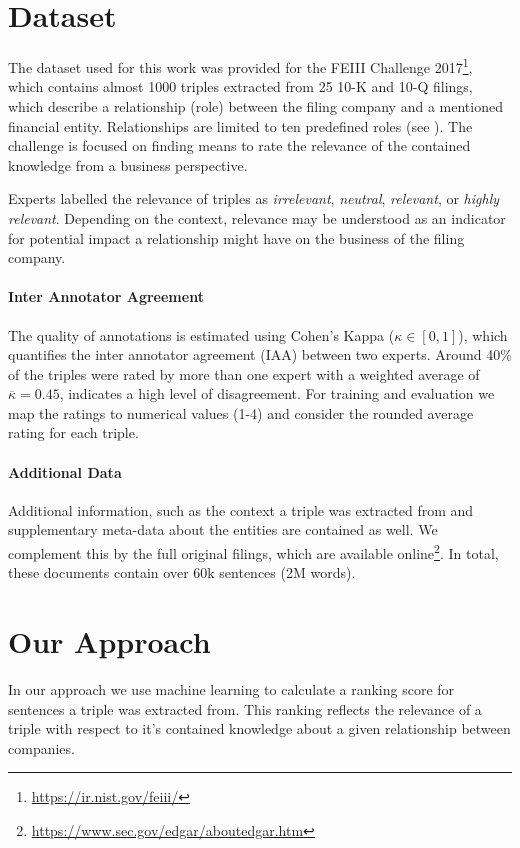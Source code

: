 \section{Dataset}
The dataset used for this work was provided for the FEIII Challenge 2017\footnote{\url{https://ir.nist.gov/feiii/}}, which contains almost 1000 triples extracted from 25 10-K and 10-Q filings, which describe a relationship (role) between the filing company and a mentioned financial entity.
Relationships are limited to ten predefined roles (see ).
The challenge is focused on finding means to rate the relevance of the contained knowledge from a business perspective.

Experts labelled the relevance of triples as \textit{irrelevant}, \textit{neutral}, \textit{relevant}, or \textit{highly relevant}.
Depending on the context, relevance may be understood as an indicator for potential impact a relationship might have on the business of the filing company. 

{\setlength{\parindent}{0cm}
\paragraph{\textbf{Inter Annotator Agreement}}
The quality of annotations is estimated using Cohen's Kappa ($\kappa\in [0,1]$), which quantifies the inter annotator agreement (IAA) between two experts\cite{ir}.
Around 40\% of the triples were rated by more than one expert with a weighted average of $\overline{\kappa}=0.45$, indicates a high level of disagreement.
For training and evaluation we map the ratings to numerical values (1-4) and consider the rounded average rating for each triple.
}

{\setlength{\parindent}{0cm}
\paragraph{\textbf{Additional Data}}
Additional information, such as the context a triple was extracted from and supplementary meta-data about the entities are contained as well.
We complement this by the full original filings, which are available online\footnote{\url{https://www.sec.gov/edgar/aboutedgar.htm}}.
In total, these documents contain over 60k sentences (2M words).
}

\section{Our Approach}
In our approach we use machine learning to calculate a ranking score for sentences a triple was extracted from.
This ranking reflects the relevance of a triple with respect to it's contained knowledge about a given relationship between companies.

